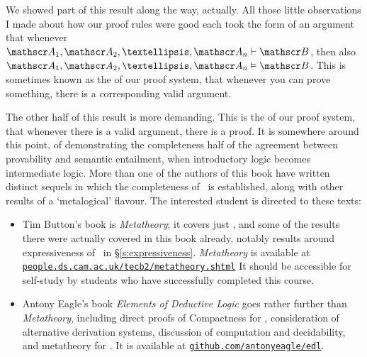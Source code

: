 We showed part of this result along the way, actually. All those little observations I made about how our proof rules were good each took the form of an argument that whenever $\meta{A}_{1}, \meta{A}_{2}, …, \meta{A}_{n} \proves\meta{B}$, then also $\meta{A}_{1}, \meta{A}_{2}, …, \meta{A}_{n} \entails\meta{B}$. This is sometimes known as the  of our proof system, that whenever you can prove something, there is a corresponding valid argument.

The other half of this result is more demanding. This is the  of our proof system, that whenever there is a valid argument, there is a proof. It is somewhere around this point, of demonstrating the completeness half of the agreement between  provability and semantic entailment, when introductory logic becomes intermediate logic. More than one of the authors of this book have written distinct sequels in which the completeness of \TFL\ is established, along with other results of a `metalogical' flavour. The interested student is directed to these texts: \begin{itemize}
	\item Tim Button's book is \emph{Metatheory}; it covers just \TFL, and some of the results there were actually covered in this book already, notably results around expressiveness of \TFL\ in §\ref{s:expressiveness}. \emph{Metatheory} is available at \href{http://people.ds.cam.ac.uk/tecb2/metatheory.shtml}{\nolinkurl{people.ds.cam.ac.uk/tecb2/metatheory.shtml}} It should be accessible for self-study by students who have successfully completed this course.

\item Antony Eagle's book \emph{Elements of Deductive Logic} goes rather further than \emph{Metatheory}, including direct proofs of Compactness for \TFL, consideration of alternative derivation systems, discussion of computation and decidability, and metatheory for \FOL. It is available at \href{https://github.com/antonyeagle/edl}{\nolinkurl{github.com/antonyeagle/edl}}.
\end{itemize}



